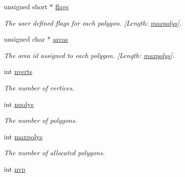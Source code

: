\begin{DoxyCompactItemize}
unsigned short $\ast$ \hyperlink{structrcPolyMesh_a36afba0b01f0050ec3ecfac73513bae5}{flags}
\begin{DoxyCompactList}\small\item\em The user defined flags for each polygon. \mbox{[}Length\+: \hyperlink{structrcPolyMesh_afc6261e7cee3e3ff2a83b6ee8baf14a9}{maxpolys}\mbox{]}. \end{DoxyCompactList}\item 
\mbox{\label{structrcPolyMesh_a6f2fa0d9eb2ecaa995b7e7a3430a46a5}} 
unsigned char $\ast$ \hyperlink{structrcPolyMesh_a6f2fa0d9eb2ecaa995b7e7a3430a46a5}{areas}
\begin{DoxyCompactList}\small\item\em The area id assigned to each polygon. \mbox{[}Length\+: \hyperlink{structrcPolyMesh_afc6261e7cee3e3ff2a83b6ee8baf14a9}{maxpolys}\mbox{]}. \end{DoxyCompactList}\item 
\mbox{\label{structrcPolyMesh_ac9c762a21343c45649638e02332e53eb}} 
int \hyperlink{structrcPolyMesh_ac9c762a21343c45649638e02332e53eb}{nverts}
\begin{DoxyCompactList}\small\item\em The number of vertices. \end{DoxyCompactList}\item 
\mbox{\label{structrcPolyMesh_abd3e50c1eb0aba7157aa3e2902ae019e}} 
int \hyperlink{structrcPolyMesh_abd3e50c1eb0aba7157aa3e2902ae019e}{npolys}
\begin{DoxyCompactList}\small\item\em The number of polygons. \end{DoxyCompactList}\item 
\mbox{\label{structrcPolyMesh_afc6261e7cee3e3ff2a83b6ee8baf14a9}} 
int \hyperlink{structrcPolyMesh_afc6261e7cee3e3ff2a83b6ee8baf14a9}{maxpolys}
\begin{DoxyCompactList}\small\item\em The number of allocated polygons. \end{DoxyCompactList}\item 
\mbox{\label{structrcPolyMesh_ab0c55272b556ffc9db9e643b463cb66a}} 
int \hyperlink{structrcPolyMesh_ab0c55272b556ffc9db9e643b463cb66a}{nvp}

\end{DoxyCompactItemize}
